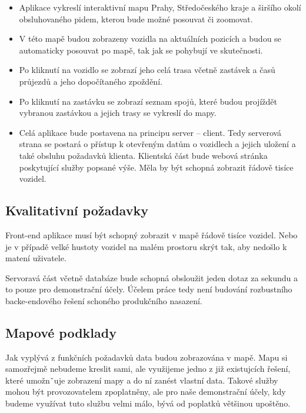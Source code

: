 \begin{itemize}

	\item Aplikace vykreslí interaktivní mapu Prahy, Středočeského kraje a širšího okolí obsluhovaného \gls{pid}em, kterou bude možné posouvat či zoomovat.

	\item V této mapě budou zobrazeny vozidla na aktuálních pozicích a budou se automaticky posouvat po mapě, tak jak se pohybují ve skutečnosti.

	\item Po kliknutí na vozidlo se zobrazí jeho celá trasa včetně zastávek a časů průjezdů a jeho dopočítaného zpoždění.

	\item Po kliknutí na zastávku se zobrazí seznam spojů, které budou projíždět vybranou zastávkou a jejich trasy se vykreslí do mapy.

	\item Celá aplikace bude postavena na principu server -- client. Tedy serverová strana se postará o přístup k otevřeným datům o vozidlech a jejich uložení a také obsluhu požadavků klienta. Klientská část bude webová stránka poskytující služby popsané výše. Měla by být schopná zobrazit řádově tisíce vozidel.

\end{itemize}

\subsection{Kvalitativní požadavky}

Front-end aplikace musí být schopný zobrazit v mapě řádově tisíce vozidel. Nebo je v případě velké hustoty vozidel na malém prostoru skrýt tak, aby nedošlo k matení uživatele.

\bigbreak

Servoravá část včetně databáze bude schopná obsloužit jeden dotaz za sekundu a to pouze pro demonstrační účely. Účelem práce tedy není budování rozbustního backe-endového řešení schoného produkčního nasazení.

\subsection{Mapové podklady}

Jak vyplývá z funkčních požadavků data budou zobrazována v mapě. Mapu si samozřejmě nebudeme kreslit sami, ale využijeme jedno z již existujcích řešení, které umožnˇuje zobrazení mapy a do ní zanést vlastní data. Takové služby mohou být provozovatelem zpoplatněny, ale pro naše demonstrační účely, kdy budeme využívat tuto službu velmi málo, bývá od poplatků většinou upoštěno.


